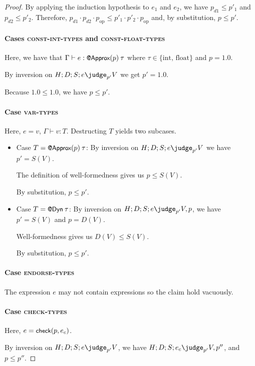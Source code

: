 {\begin{proof}
By applying the induction hypothesis to $e_1$ and $e_2$, we have
$p_{d1} \le p'_1$ and $p_{d2} \le p'_2$.
Therefore,
$p_{d1} \cdot p_{d2} \cdot p_\text{op} \le p'_1 \cdot p'_2 \cdot p_\text{op}$
and, by substitution, $p \le p'$.

\paragraph{Cases \textsc{const-int-types} and \textsc{const-float-types}}
Here, we have that
$\Gamma \vdash e : \text{\normalfont{\sffamily\small{@Approx}}}(p) \> \tau$
where
$\tau \in \{\text{int, float}\}$
and
$p = 1.0$.

By inversion on $H ; D ; S ; e \pjudge{p'} V$ we get $p' = 1.0$.

Because $1.0 \le 1.0$, we have $p \le p'$.

\paragraph{Case \textsc{var-types}}
Here, $e = v$, $\Gamma \vdash v : T$.
Destructing $T$ yields two subcases.
    \begin{itemize}
    \item Case $T = \text{\normalfont{\sffamily\small{@Approx}}}(p) \> \tau$:
    By inversion on $H ; D ; S ; e \pjudge{p'} V$ we have $p' = S(V)$.

    The definition of well-formedness gives us $p \le S(V)$.

    By substitution, $p \le p'$.

    \item Case $T = \text{\normalfont{\sffamily\small{@Dyn}}} \> \tau$:
    By inversion on $H ; D ; S ; e \pjudge{p'} V, p$, we have $p' = S(V)$ and
    $p = D(V)$.

    Well-formedness gives us $D(V) \le S(V)$.

    By substitution, $p \le p'$.
    \end{itemize}

\paragraph{Case \textsc{endorse-types}}
The expression
$e$ may not contain  expressions so the claim hold vacuously.

\paragraph{Case \textsc{check-types}}
Here, $e = \text{\normalfont{\sffamily\small{check}}}(p, e_c)$.

By inversion on $H ; D ; S ; e \pjudge{p'} V$, we have
$H ; D ; S ; e_c \pjudge{p'} V, p''$, and
$p \le p''$.


\end{proof}}
